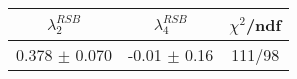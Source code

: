 \begin{tabular}{c|c||c}
$\lambda_{2}^{RSB}$ & $\lambda_4^{RSB}$ & $\chi^{2}$/ndf \\
\hline
0.378 $\pm$ 0.070 & -0.01 $\pm$ 0.16 & 111/98\\
\end{tabular}
